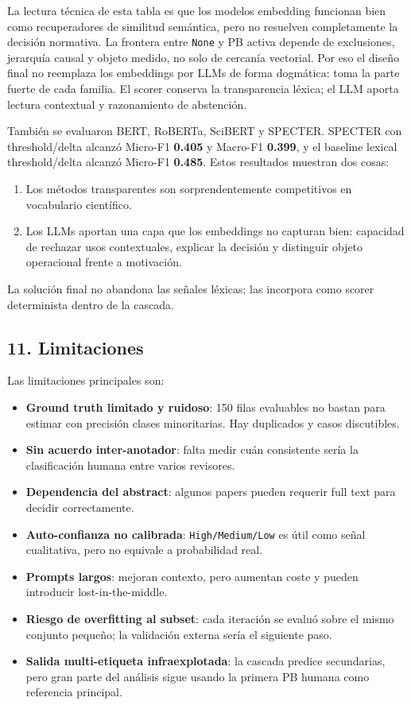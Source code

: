 La lectura técnica de esta tabla es que los modelos embedding funcionan bien como recuperadores de similitud semántica, pero no resuelven completamente la decisión normativa. La frontera entre \texttt{None} y PB activa depende de exclusiones, jerarquía causal y objeto medido, no solo de cercanía vectorial. Por eso el diseño final no reemplaza los embeddings por LLMs de forma dogmática: toma la parte fuerte de cada familia. El scorer conserva la transparencia léxica; el LLM aporta lectura contextual y razonamiento de abstención.

También se evaluaron BERT, RoBERTa, SciBERT y SPECTER. SPECTER con threshold/delta alcanzó Micro-F1 \textbf{0.405} y Macro-F1 \textbf{0.399}, y el baseline lexical threshold/delta alcanzó Micro-F1 \textbf{0.485}. Estos resultados muestran dos cosas:

\begin{enumerate}
\item Los métodos transparentes son sorprendentemente competitivos en vocabulario científico.
\item Los LLMs aportan una capa que los embeddings no capturan bien: capacidad de rechazar usos contextuales, explicar la decisión y distinguir objeto operacional frente a motivación.
\end{enumerate}

La solución final no abandona las señales léxicas; las incorpora como scorer determinista dentro de la cascada.

\subsection{11. Limitaciones}

Las limitaciones principales son:

\begin{itemize}
\item \textbf{Ground truth limitado y ruidoso}: 150 filas evaluables no bastan para estimar con precisión clases minoritarias. Hay duplicados y casos discutibles.
\item \textbf{Sin acuerdo inter-anotador}: falta medir cuán consistente sería la clasificación humana entre varios revisores.
\item \textbf{Dependencia del abstract}: algunos papers pueden requerir full text para decidir correctamente.
\item \textbf{Auto-confianza no calibrada}: \texttt{High/Medium/Low} es útil como señal cualitativa, pero no equivale a probabilidad real.
\item \textbf{Prompts largos}: mejoran contexto, pero aumentan coste y pueden introducir lost-in-the-middle.
\item \textbf{Riesgo de overfitting al subset}: cada iteración se evaluó sobre el mismo conjunto pequeño; la validación externa sería el siguiente paso.
\item \textbf{Salida multi-etiqueta infraexplotada}: la cascada predice secundarias, pero gran parte del análisis sigue usando la primera PB humana como referencia principal.
\end{itemize}

